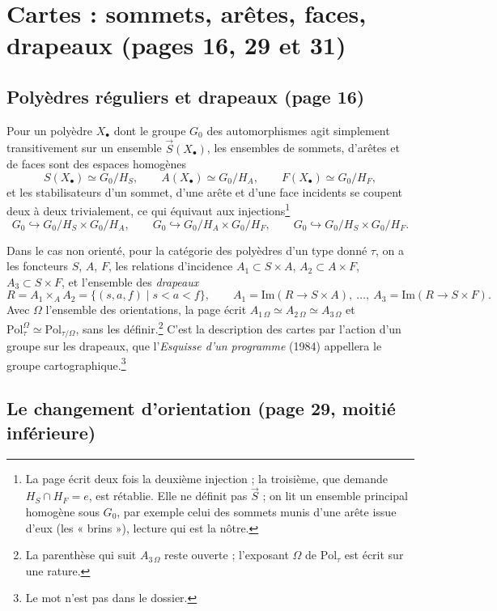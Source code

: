\documentclass[11pt,a4paper]{article}
\begin{document}
\section*{Cartes : sommets, arêtes, faces, drapeaux (pages 16, 29 et 31)}

\subsection*{Polyèdres réguliers et drapeaux (page 16)}

Pour un polyèdre $X_\bullet$ dont le groupe $G_0$ des automorphismes agit
simplement transitivement sur un ensemble $\vec{S}(X_\bullet)$, les ensembles de
sommets, d'arêtes et de faces sont des espaces homogènes
\[
S(X_\bullet) \simeq G_0/H_S, \qquad A(X_\bullet) \simeq G_0/H_A, \qquad
F(X_\bullet) \simeq G_0/H_F ,
\]
et les stabilisateurs d'un sommet, d'une arête et d'une face incidents se coupent
deux à deux trivialement, ce qui équivaut aux injections\footnote{La page écrit deux fois la deuxième injection ; la troisième, que
demande $H_S \cap H_F = e$, est rétablie. Elle ne définit pas $\vec{S}$ ; on lit
un ensemble principal homogène sous $G_0$, par exemple celui des sommets munis
d'une arête issue d'eux (les « brins »), lecture qui est la nôtre.}
\[
G_0 \hookrightarrow G_0/H_S \times G_0/H_A, \qquad
G_0 \hookrightarrow G_0/H_A \times G_0/H_F, \qquad
G_0 \hookrightarrow G_0/H_S \times G_0/H_F .
\]


Dans le cas non orienté, pour la catégorie des polyèdres d'un type donné $\tau$,
on a les foncteurs $S$, $A$, $F$, les relations d'incidence
$A_1 \subset S \times A$, $A_2 \subset A \times F$, $A_3 \subset S \times F$, et
l'ensemble des \emph{drapeaux}
\[
R = A_1 \times_A A_2 = \{ (s, a, f) \mid s < a < f \}, \qquad
A_1 = \mathrm{Im}(R \to S \times A),\ \ldots,\ A_3 = \mathrm{Im}(R \to S \times F) .
\]
Avec $\Omega$ l'ensemble des orientations, la page écrit $A_{1\,\Omega} \simeq
A_{2\,\Omega} \simeq A_{3\,\Omega}$ et $\mathrm{Pol}_\tau^{\Omega} \simeq
\mathrm{Pol}_{\tau/\Omega}$, sans les définir.\footnote{La parenthèse qui suit
$A_{3\,\Omega}$ reste ouverte ; l'exposant $\Omega$ de $\mathrm{Pol}_\tau$ est
écrit sur une rature.} C'est la description des cartes par l'action d'un groupe
sur les drapeaux, que l'\emph{Esquisse d'un programme} (1984) appellera le groupe
cartographique.\footnote{Le mot n'est pas dans le dossier.}

\subsection*{Le changement d'orientation (page 29, moitié inférieure)}
\end{document}

